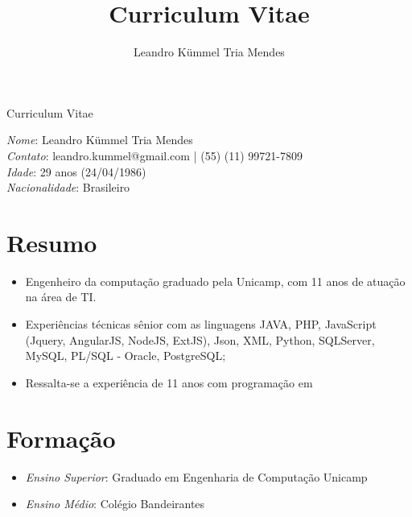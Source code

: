 \documentclass[a4paper,11pt]{article}
\title{Curriculum Vitae}
\author{Leandro Kümmel Tria Mendes}
\begin{document}
\begin{center} 
Curriculum Vitae
\end{center} 
\emph{Nome}: Leandro Kümmel Tria Mendes\\
\emph{Contato}: leandro.kummel@gmail.com | (55) (11) 99721-7809\\
\emph{Idade}: 29 anos (24/04/1986)\\
\emph{Nacionalidade}: Brasileiro\\
\section{Resumo}
\begin{itemize}
\item Engenheiro da computação graduado pela Unicamp, com 11 anos de atuação na área de TI.
\item Experiências técnicas sênior com as linguagens JAVA, PHP, JavaScript (Jquery, AngularJS, NodeJS, ExtJS), Json, XML, Python, SQLServer, MySQL, PL/SQL - Oracle, PostgreSQL;
\item Ressalta-se a experiência de 11 anos com programação em 
\end{itemize}

\section{Formação}
\begin{itemize}
\item \emph{Ensino Superior}: Graduado em Engenharia de Computação Unicamp 
\item \emph{Ensino Médio}: Colégio Bandeirantes

\end{itemize}
\end{document}
